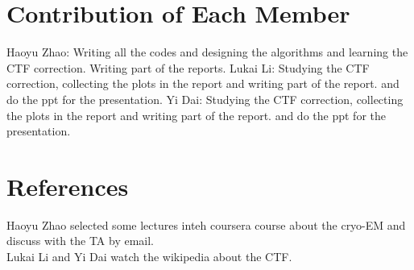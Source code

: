 \documentclass{article}
\begin{document}
\section{Contribution of Each Member}
Haoyu Zhao: Writing all the codes and designing the algorithms and learning the CTF correction. Writing part of the reports.
Lukai Li: Studying the CTF correction, collecting the plots in the report and writing part of the report. and do the ppt for the presentation.
Yi Dai: Studying the CTF correction, collecting the plots in the report and writing part of the report. and do the ppt for the presentation.

\section{References}
Haoyu Zhao selected some lectures inteh coursera course about the cryo-EM and discuss with the TA by email.\\
Lukai Li and Yi Dai watch the wikipedia about the CTF.
\end{document}
